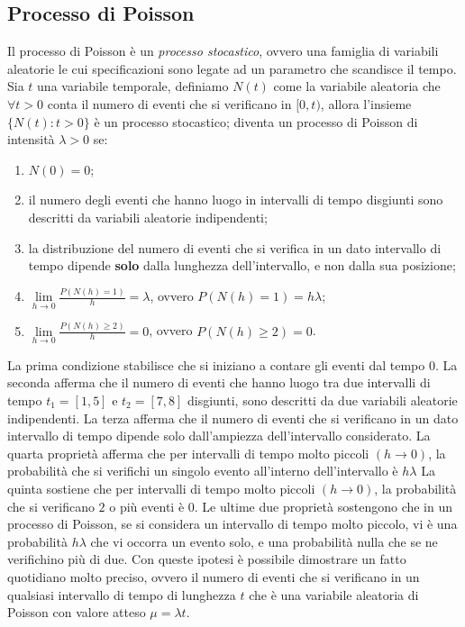 \subsection{Processo di Poisson}
Il processo di Poisson è un \textit{processo stocastico}, ovvero una famiglia di variabili aleatorie le cui specificazioni sono legate ad un parametro che scandisce il tempo. \\ 
Sia $t$ una variabile temporale, definiamo $N(t)$ come la variabile aleatoria che $\forall t > 0$ conta il numero di eventi che si verificano in $[0,t)$, allora l'insieme $\{N(t) : t > 0\}$ è un processo stocastico; diventa un processo di Poisson di intensità $\lambda > 0$ se:
\begin{enumerate}
    \item $N(0) = 0$;
    \item il numero degli eventi che hanno luogo in intervalli di tempo disgiunti sono descritti da variabili aleatorie indipendenti;
    \item la distribuzione del numero di eventi che si verifica in un dato intervallo di tempo dipende \textbf{solo} dalla lunghezza dell'intervallo, e non dalla sua posizione;
    \item $\displaystyle \lim\limits_{h \to 0} \frac{P(N(h) = 1)}{h} = \lambda$, ovvero $P(N(h) = 1) = h \lambda$;
    \item $\displaystyle \lim\limits_{h \to 0} \frac{P(N(h) \geq 2)}{h} = 0$, ovvero $P(N(h) \geq 2) = 0$.
\end{enumerate}
La prima condizione stabilisce che si iniziano a contare gli eventi dal tempo $0$.
\newline
La seconda afferma che il numero di eventi che hanno luogo tra due intervalli di tempo $t_1 = [1,5]$ e $t_2 = [7,8]$ disgiunti, sono descritti da due variabili aleatorie indipendenti.
\newline
La terza afferma che il numero di eventi che si verificano in un dato intervallo di tempo dipende solo dall'ampiezza dell'intervallo considerato.
\newline
La quarta proprietà afferma che per intervalli di tempo molto piccoli $(h \rightarrow 0)$, la probabilità che si verifichi un singolo evento all'interno dell'intervallo è $h\lambda$
\newline
La quinta sostiene che per intervalli di tempo molto piccoli $(h \rightarrow 0)$, la probabilità che si verificano $2$ o più eventi è $0$.
\newline
Le ultime due proprietà sostengono che in un processo di Poisson, se si considera un intervallo di tempo molto piccolo, vi è una probabilità $h\lambda$ che vi occorra un evento solo, e una probabilità nulla che se ne verifichino più di due.
\newline \newline
\noindent Con queste ipotesi è possibile dimostrare un fatto quotidiano molto preciso, ovvero il numero di eventi che si verificano in un qualsiasi intervallo di tempo di lunghezza $t$ che è una variabile aleatoria di Poisson con valore atteso $\mu = \lambda t$.

